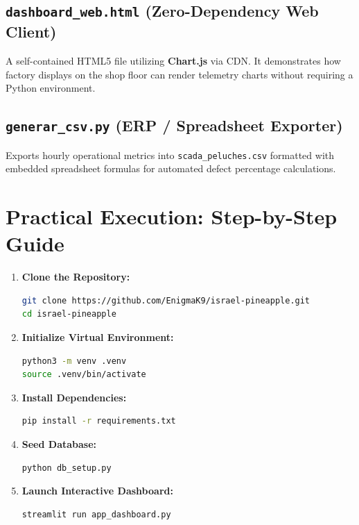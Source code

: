 \documentclass[11pt,letterpaper]{article}
\begin{document}
\subsection{\texttt{dashboard\_web.html} (Zero-Dependency Web Client)}
A self-contained HTML5 file utilizing \textbf{Chart.js} via CDN. It demonstrates how factory displays on the shop floor can render telemetry charts without requiring a Python environment.

\subsection{\texttt{generar\_csv.py} (ERP / Spreadsheet Exporter)}
Exports hourly operational metrics into \texttt{scada\_peluches.csv} formatted with embedded spreadsheet formulas for automated defect percentage calculations.

\section{Practical Execution: Step-by-Step Guide}

\begin{enumerate}[leftmargin=*]
    \item \textbf{Clone the Repository:}
    \begin{lstlisting}[language=bash]
git clone https://github.com/EnigmaK9/israel-pineapple.git
cd israel-pineapple
    \end{lstlisting}

    \item \textbf{Initialize Virtual Environment:}
    \begin{lstlisting}[language=bash]
python3 -m venv .venv
source .venv/bin/activate
    \end{lstlisting}

    \item \textbf{Install Dependencies:}
    \begin{lstlisting}[language=bash]
pip install -r requirements.txt
    \end{lstlisting}

    \item \textbf{Seed Database:}
    \begin{lstlisting}[language=bash]
python db_setup.py
    \end{lstlisting}

    \item \textbf{Launch Interactive Dashboard:}
    \begin{lstlisting}[language=bash]
streamlit run app_dashboard.py
    \end{lstlisting}
\end{enumerate}
\end{document}
